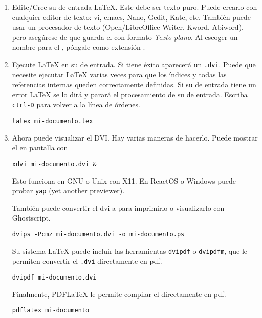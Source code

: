 \begin{enumerate}
\item Edite/Cree su \filenomo{} de entrada \LaTeX{}.  Este \filenomo{} debe ser texto puro.  Puede crearlo con cualquier editor de texto: vi, emacs, Nano, Gedit, Kate, etc.  También puede usar un procesador de texto (Open/Libre\-Office Writer, Kword, Abiword), pero asegúrese de que guarda el \filenomo{} con formato \emph{Texto plano}.  Al escoger un nombre para el \filenomo{}, póngale como extensión .

\item Ejecute \LaTeX{} en su \filenomo{} de entrada.  Si tiene éxito aparecerá un \filenomo{} \texttt{.dvi}.  Puede que necesite ejecutar \LaTeX{} varias veces para que los índices y todas las referencias internas queden correctamente definidas.  Si su \filenomo{} de entrada tiene un error \LaTeX{} se lo dirá y parará el procesamiento de su \filenomo{} de entrada.  Escriba \texttt{ctrl-D} para volver a la línea de órdenes.
\begin{lscommand}
\verb+latex mi-documento.tex+
\end{lscommand}

\item Ahora puede visualizar el \filenomo{} DVI.  Hay varias maneras de hacerlo. Puede mostrar el \filenomo{} en pantalla con
\begin{lscommand}
\verb+xdvi mi-documento.dvi &+
\end{lscommand}
Esto funciona en GNU o Unix con X11.  En ReactOS o Windows puede probar \texttt{yap} (yet another previewer).

También puede convertir el \filenomo{} dvi a \PSi{} para imprimirlo o visualizarlo con Ghostscript.
\begin{lscommand}
\verb+dvips -Pcmz mi-documento.dvi -o mi-documento.ps+
\end{lscommand}

Su sistema \LaTeX{} puede incluir las herramientas \texttt{dvipdf} o \texttt{dvipdfm}, que le permiten convertir el \filenomo{} \texttt{.dvi}
directamente en pdf.
\begin{lscommand}
\verb+dvipdf mi-documento.dvi+
\end{lscommand}

Finalmente, PDF\LaTeX{} le permite compilar el \filenomo{} directamente en pdf.
\begin{lscommand}
\verb+pdflatex mi-documento+
\end{lscommand}
\end{enumerate}
 

